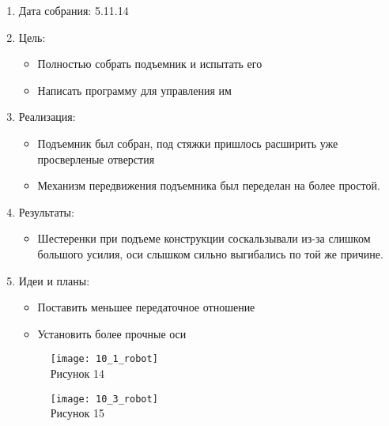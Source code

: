 \documentclass[11pt]{article}
\begin{document}
	\begin{enumerate}
		\item Дата собрания: 5.11.14
		\item Цель:
		\begin{itemize}
			\item Полностью собрать подъемник и испытать его
			\item Написать программу для управления им
		\end{itemize}			
		\item Реализация:
		\begin{itemize}
			\item Подъемник был собран, под стяжки пришлось расширить уже просверленые отверстия
			\item Механизм передвижения подъемника был переделан на более простой.
		\end{itemize}
		\item Результаты:
		\begin{itemize}
			\item Шестеренки при подъеме конструкции соскальзывали из-за слишком большого усилия, оси слышком сильно выгибались по той же причине.
		\end{itemize}
		\item Идеи и планы:
		\begin{itemize}
			\item Поставить меньшее передаточное отношение
			\item Установить более прочные оси
		\end{itemize}
		\begin{figure} [h]
			\centering
			\begin{minipage}{0.3\linewidth}
				\texttt{[image: 10\_1\_robot]}\\ Рисунок 14
			\end{minipage}
			\begin{minipage}{0.3\linewidth}
				\texttt{[image: 10\_3\_robot]}\\ Рисунок 15
			\end{minipage}
		\end{figure}
	\end{enumerate}
\end{document}
